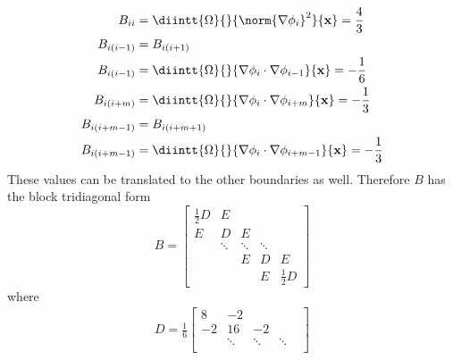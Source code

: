 \documentclass[11pt, titlepage]{article}
\begin{document}
\begin{enumerate}
\begin{enumerate}
        \begin{align*}
          B_{ii} &= \diintt{\Omega}{}{\norm{\nabla \phi_i}^2}{\v{x}} = \frac{4}{3} \\
          B_{i(i-1)} &= B_{i(i+1)} \\
          B_{i(i-1)} &= \diintt{\Omega}{}{\nabla \phi_i \cdot \nabla \phi_{i-1}}{\v{x}} = -\frac{1}{6} \\
          B_{i(i+m)} &=\diintt{\Omega}{}{\nabla \phi_i \cdot \nabla \phi_{i+m}}{\v{x}} = -\frac{1}{3} \\
          B_{i(i+m-1)} &= B_{i(i+m+1)} \\
          B_{i(i+m-1)} &= \diintt{\Omega}{}{\nabla \phi_i \cdot \nabla \phi_{i+m-1}}{\v{x}} = -\frac{1}{3} \\
        \end{align*}
        These values can be translated to the other boundaries as well.
        Therefore $B$ has the block tridiagonal form
        \[
          B =
          \begin{bmatrix}
            \frac{1}{2}D & E      &        &        &     \\
            E            & D      & E      &        &     \\
                         & \ddots & \ddots & \ddots &     \\
                         &        & E      & D      & E   \\
                         &        &        & E      & \frac{1}{2}D
          \end{bmatrix}
        \]
        where
        \begin{align*}
          D =
          \frac{1}{6}
          \begin{bmatrix}
             8 & -2     &        &        &    \\
            -2 & 16     & -2     &        &    \\
               & \ddots & \ddots & \ddots &    \\

\end{bmatrix}
\end{align*}
\end{enumerate}
\end{enumerate}
\end{document}
